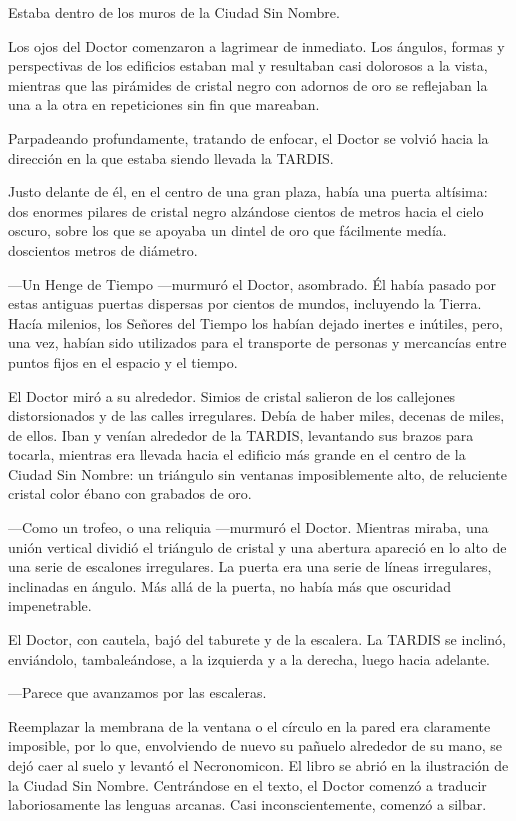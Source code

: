 Estaba dentro de los muros de la Ciudad Sin Nombre.

Los ojos del Doctor comenzaron a lagrimear de inmediato. Los ángulos,
formas y perspectivas de los edificios estaban mal y resultaban casi
dolorosos a la vista, mientras que las pirámides de cristal negro con
adornos de oro se reflejaban la una a la otra en repeticiones sin fin
que mareaban.

Parpadeando profundamente, tratando de enfocar, el Doctor se volvió
hacia la dirección en la que estaba siendo llevada la TARDIS.

Justo delante de él, en el centro de una gran plaza, había una puerta
altísima: dos enormes pilares de cristal negro alzándose cientos de
metros hacia el cielo oscuro, sobre los que se  apoyaba un dintel de oro
que fácilmente medía. doscientos metros de diámetro.

---Un Henge de Tiempo ---murmuró el Doctor, asombrado. Él había pasado
por estas antiguas puertas dispersas por cientos de mundos, incluyendo
la Tierra. Hacía milenios, los Señores del Tiempo los habían dejado
inertes e inútiles, pero, una vez, habían sido utilizados para el
transporte de personas y mercancías entre puntos fijos en el espacio y
el tiempo.

El Doctor miró a su alrededor. Simios de cristal salieron de los
callejones distorsionados y de las calles irregulares. Debía
de haber miles, decenas de miles, de ellos. Iban y venían alrededor de
la TARDIS, levantando sus brazos para tocarla, mientras era llevada
hacia el edificio más grande en el centro de la Ciudad Sin Nombre: un
triángulo sin ventanas imposiblemente alto, de reluciente cristal color
ébano con grabados de oro.

---Como un trofeo, o una reliquia ---murmuró el Doctor. Mientras miraba,
una unión vertical dividió el triángulo de cristal y una abertura
apareció en lo alto de una serie de escalones irregulares. La puerta era
una serie de líneas irregulares, inclinadas en ángulo. Más allá de la
puerta, no había más que oscuridad impenetrable.

El Doctor, con cautela, bajó del taburete y de la escalera. La TARDIS se
inclinó, enviándolo, tambaleándose, a la izquierda y a la derecha, luego
hacia adelante.

---Parece que avanzamos por las escaleras.

Reemplazar la membrana de la ventana o el círculo en la pared era
claramente imposible, por lo que, envolviendo de nuevo su pañuelo
alrededor de su mano, se dejó caer al suelo y levantó el Necronomicon.
El libro se abrió en la ilustración de la Ciudad Sin Nombre. Centrándose
en el texto, el Doctor comenzó a traducir laboriosamente las lenguas
arcanas. Casi inconscientemente, comenzó a silbar.

